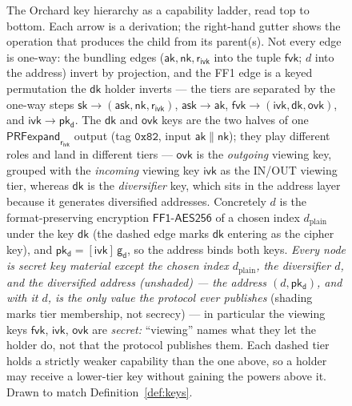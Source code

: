 \documentclass[11pt,a4paper]{article}
\theoremstyle{definition}
\newcommand{\ask}{\ensuremath{\mathsf{ask}}}
\newcommand{\aksym}{\ensuremath{\mathsf{ak}}}
\newcommand{\nksym}{\ensuremath{\mathsf{nk}}}
\newcommand{\ivk}{\ensuremath{\mathsf{ivk}}}
\newcommand{\fvk}{\ensuremath{\mathsf{fvk}}}
\newcommand{\ovk}{\ensuremath{\mathsf{ovk}}}
\newcommand{\dk}{\ensuremath{\mathsf{dk}}}
\newcommand{\pkd}{\ensuremath{\mathsf{pk_d}}}
\newcommand{\gd}{\ensuremath{\mathsf{g_d}}}
\newcommand{\rivk}{\ensuremath{\mathsf{r_{ivk}}}}
\begin{document}
\begin{figure}[htbp]
{%
}
\caption{The Orchard key hierarchy as a capability ladder, read top to
bottom. Each arrow is a derivation; the right-hand gutter shows the
operation that produces the child from its parent(s). Not every edge is
one-way: the bundling edges ($\aksym,\nksym,\rivk$ into the tuple $\fvk$;
$d$ into the address) invert by projection, and the FF1 edge is a keyed
permutation the $\dk$ holder inverts --- the tiers are separated by the
one-way steps $\mathsf{sk}\to(\ask,\nksym,\rivk)$, $\ask\to\aksym$,
$\fvk\to(\ivk,\dk,\ovk)$, and $\ivk\to\pkd$. The $\dk$ and
$\ovk$ keys are the two halves of one $\mathsf{PRFexpand}_{\rivk}$ output (tag
$\mathtt{0x82}$, input $\aksym\|\nksym$); they play different roles and land
in different tiers --- $\ovk$ is the \emph{outgoing} viewing key, grouped with
the \emph{incoming} viewing key $\ivk$ as the IN/OUT viewing tier, whereas
$\dk$ is the \emph{diversifier} key, which sits in the address layer because
it generates diversified addresses. Concretely $d$ is the format-preserving
encryption $\mathsf{FF1\text{-}AES256}$ of a chosen index $d_{\mathrm{plain}}$
under the key $\dk$ (the dashed edge marks $\dk$ entering as the cipher key),
and $\pkd=[\ivk]\,\gd$, so the address binds both keys.
\emph{Every node is secret key material except the chosen index
$d_{\mathrm{plain}}$, the diversifier $d$, and the diversified address
(unshaded) --- the address $(d,\pkd)$, and with it $d$, is the only value
the protocol ever publishes} (shading marks tier membership, not secrecy) ---
in particular the viewing keys $\fvk$, $\ivk$, $\ovk$ are \emph{secret:}
``viewing''
names what they let the holder do, not that the protocol publishes them. Each dashed
tier holds a strictly weaker capability than the one above, so a holder may
receive a lower-tier key without gaining the powers above it. Drawn to
match Definition~\ref{def:keys}.}
\label{fig:keytree}
\end{figure}
\end{document}
